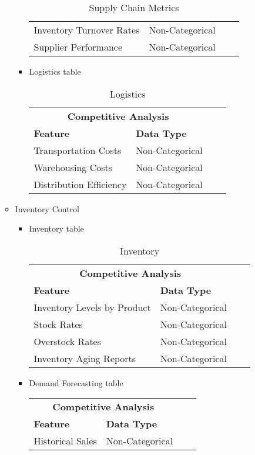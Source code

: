 \documentclass[12pt,a4Paper]{article}
\begin{document}
\begin{enumerate}
\begin{itemize}
\begin{itemize}
\begin{table}
\begin{tabular}{llll}
		Inventory Turnover Rates & Non-Categorical\\
		Supplier Performance & Non-Categorical\\\hline
		\end{tabular}
		\centering
		\caption{Supply Chain Metrics}
		\end{table}
		\newpage
		\item Logistics table
		\begin{table}
		\begin{tabular}{llll}\hline
		\multicolumn{2}{c}{\textbf{Competitive Analysis}} & &\\
		\textbf{Feature} & \textbf{Data Type}\\\hline
		Transportation Costs & Non-Categorical\\
		Warehousing Costs & Non-Categorical\\
		Distribution Efficiency & Non-Categorical\\\hline
		\end{tabular}
		\centering
		\caption{Logistics}
		\end{table}
		\end{itemize}
	\item Inventory Control
		\begin{itemize}
		\item Inventory table
		\begin{table}
		\begin{tabular}{llll}\hline
		\multicolumn{2}{c}{\textbf{Competitive Analysis}} & &\\
		\textbf{Feature} & \textbf{Data Type}\\\hline
		Inventory Levels by Product & Non-Categorical\\
		Stock Rates & Non-Categorical\\
		Overstock Rates & Non-Categorical\\
		Inventory Aging Reports & Non-Categorical\\\hline
		\end{tabular}
		\centering
		\caption{Inventory}
		\end{table}
		\item Demand Forecasting table
		\begin{table}
		\begin{tabular}{llll}\hline
		\multicolumn{2}{c}{\textbf{Competitive Analysis}} & &\\
		\textbf{Feature} & \textbf{Data Type}\\\hline
		Historical Sales & Non-Categorical\\

\end{tabular}
\end{table}
\end{itemize}
\end{itemize}
\end{enumerate}
\end{document}
